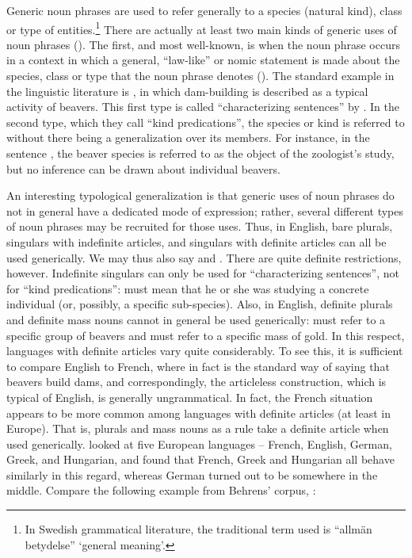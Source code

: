 Generic noun phrases are used to refer generally to a species (natural kind), class or type of entities.\footnote{ In Swedish grammatical literature, the traditional term used is “allmän betydelse” ‘general meaning’.} There are actually at least two main kinds of generic uses of noun phrases (\citet[19]{KrifkaEtAl1995}). The first, and most well-known, is when the noun phrase occurs in a context in which a general, “law-like” or nomic statement is made about the species, class or type that the noun phrase denotes (\citet{Dahl1973}). The\textbf{ }standard example in the linguistic literature is , in which dam-building is described as a typical activity of beavers. This first type is called “characterizing sentences” by \citet{KrifkaEtAl1995}. In the second type, which they call “kind predications”, the species or kind is referred to without there being a generalization over its members. For instance, in the sentence , the beaver species is referred to as the object of the zoologist’s study, but no inference can be drawn about individual beavers.

An interesting typological generalization is that generic uses of noun phrases do not in general have a dedicated mode of expression; rather, several different types of noun phrases may be recruited for those uses. Thus, in English, bare plurals, singulars with indefinite articles, and singulars with definite articles can all be used generically. We may thus also say  and . There are quite definite restrictions, however. Indefinite singulars can only be used for “characterizing sentences”, not for “kind predications”: must mean that he or she was studying a concrete individual (or, possibly, a specific sub-species). Also, in English, definite plurals and definite mass nouns cannot in\textbf{ }general be used generically:  must refer to a specific group of beavers and  must refer to a specific mass of gold. In this respect, languages with definite articles vary quite considerably. To see this, it is sufficient to compare English to French, where in fact  is the standard way of saying that beavers build dams, and correspondingly, the articleless construction, which is typical of English, is generally ungrammatical. In fact, the French situation appears to be more common among languages with definite articles (at least in Europe). That is, plurals and mass nouns as a rule take a definite article when used generically. \citet{Behrens2005} looked at five European languages – French, English, German, Greek, and Hungarian, and found that French, Greek and Hungarian all behave similarly in this regard, whereas German turned out to be somewhere in the middle. Compare the following example from Behrens’ corpus, :

